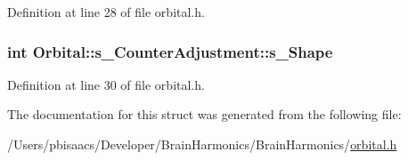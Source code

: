 Definition at line 28 of file orbital.\+h.

\subsubsection[{\texorpdfstring{s\+\_\+\+Shape}{s_Shape}}]{\setlength{\rightskip}{0pt plus 5cm}int Orbital\+::s\+\_\+\+Counter\+Adjustment\+::s\+\_\+\+Shape}\hypertarget{struct_orbital_1_1s___counter_adjustment_a4564ec57f2f73fb6fbccb5dd5b451fd7}{}\label{struct_orbital_1_1s___counter_adjustment_a4564ec57f2f73fb6fbccb5dd5b451fd7}


Definition at line 30 of file orbital.\+h.



The documentation for this struct was generated from the following file\+:\begin{DoxyCompactItemize}
\item 
/\+Users/pbisaacs/\+Developer/\+Brain\+Harmonics/\+Brain\+Harmonics/\hyperlink{orbital_8h}{orbital.\+h}\end{DoxyCompactItemize}
